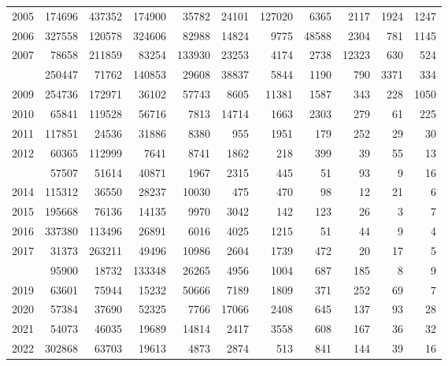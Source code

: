 \documentclass[
]{article}
\begin{document}
\begin{longtable}[t]{lrrrrrrrrrr}
2005 & 174696 & 437352 & 174900 & 35782 & 24101 & 127020 & 6365 & 2117 & 1924 & 1247\\
2006 & 327558 & 120578 & 324606 & 82988 & 14824 & 9775 & 48588 & 2304 & 781 & 1145\\
2007 & 78658 & 211859 & 83254 & 133930 & 23253 & 4174 & 2738 & 12323 & 630 & 524\\
\addlinespace
2008 & 250447 & 71762 & 140853 & 29608 & 38837 & 5844 & 1190 & 790 & 3371 & 334\\
2009 & 254736 & 172971 & 36102 & 57743 & 8605 & 11381 & 1587 & 343 & 228 & 1050\\
2010 & 65841 & 119528 & 56716 & 7813 & 14714 & 1663 & 2303 & 279 & 61 & 225\\
2011 & 117851 & 24536 & 31886 & 8380 & 955 & 1951 & 179 & 252 & 29 & 30\\
2012 & 60365 & 112999 & 7641 & 8741 & 1862 & 218 & 399 & 39 & 55 & 13\\
\addlinespace
2013 & 57507 & 51614 & 40871 & 1967 & 2315 & 445 & 51 & 93 & 9 & 16\\
2014 & 115312 & 36550 & 28237 & 10030 & 475 & 470 & 98 & 12 & 21 & 6\\
2015 & 195668 & 76136 & 14135 & 9970 & 3042 & 142 & 123 & 26 & 3 & 7\\
2016 & 337380 & 113496 & 26891 & 6016 & 4025 & 1215 & 51 & 44 & 9 & 4\\
2017 & 31373 & 263211 & 49496 & 10986 & 2604 & 1739 & 472 & 20 & 17 & 5\\
\addlinespace
2018 & 95900 & 18732 & 133348 & 26265 & 4956 & 1004 & 687 & 185 & 8 & 9\\
2019 & 63601 & 75944 & 15232 & 50666 & 7189 & 1809 & 371 & 252 & 69 & 7\\
2020 & 57384 & 37690 & 52325 & 7766 & 17066 & 2408 & 645 & 137 & 93 & 28\\
2021 & 54073 & 46035 & 19689 & 14814 & 2417 & 3558 & 608 & 167 & 36 & 32\\
2022 & 302868 & 63703 & 19613 & 4873 & 2874 & 513 & 841 & 144 & 39 & 16\\*
\end{longtable}
\end{document}
